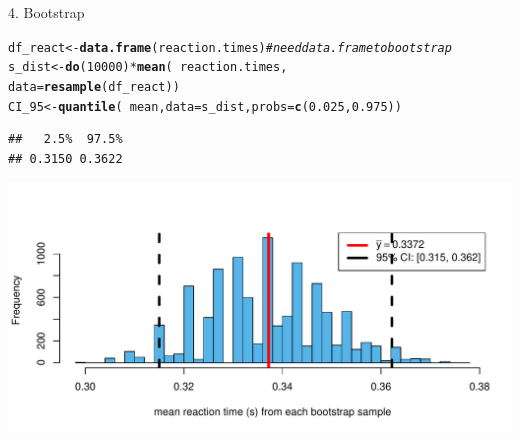 \documentclass{beamer}\usepackage[]{graphicx}\usepackage[]{color}
\newcommand{\hlnum}[1]{\textcolor[rgb]{0.686,0.059,0.569}{#1}}%
\newcommand{\hlcom}[1]{\textcolor[rgb]{0.678,0.584,0.686}{\textit{#1}}}%
\newcommand{\hlopt}[1]{\textcolor[rgb]{0,0,0}{#1}}%
\newcommand{\hlstd}[1]{\textcolor[rgb]{0.345,0.345,0.345}{#1}}%
\newcommand{\hlkwb}[1]{\textcolor[rgb]{0.69,0.353,0.396}{#1}}%
\newcommand{\hlkwc}[1]{\textcolor[rgb]{0.333,0.667,0.333}{#1}}%
\newcommand{\hlkwd}[1]{\textcolor[rgb]{0.737,0.353,0.396}{\textbf{#1}}}%
\newenvironment{knitrout}{}{} %
\begin{document}
\begin{frame}[fragile]{4. Bootstrap}

\begin{knitrout}\scriptsize
{}\color{fgcolor}
\begin{alltt}
\hlstd{df_react} \hlkwb{<-} \hlkwd{data.frame}\hlstd{(reaction.times)} \hlcom{# need data.frame to bootstrap}
\hlstd{s_dist} \hlkwb{<-} \hlkwd{do}\hlstd{(}\hlnum{10000}\hlstd{)} \hlopt{*} \hlkwd{mean}\hlstd{(} \hlopt{~} \hlstd{reaction.times,}
                \hlkwc{data} \hlstd{=} \hlkwd{resample}\hlstd{(df_react))}
\hlstd{CI_95} \hlkwb{<-} \hlkwd{quantile}\hlstd{(}\hlopt{~} \hlstd{mean,} \hlkwc{data} \hlstd{= s_dist,} \hlkwc{probs} \hlstd{=} \hlkwd{c}\hlstd{(}\hlnum{0.025}\hlstd{,} \hlnum{0.975}\hlstd{))}
\end{alltt}
\begin{verbatim}
##   2.5%  97.5% 
## 0.3150 0.3622
\end{verbatim}


{\centering \includegraphics[width=1\linewidth]{figure/unnamed-chunk-19-1} 

}



\end{knitrout}

\end{frame}
\end{document}
